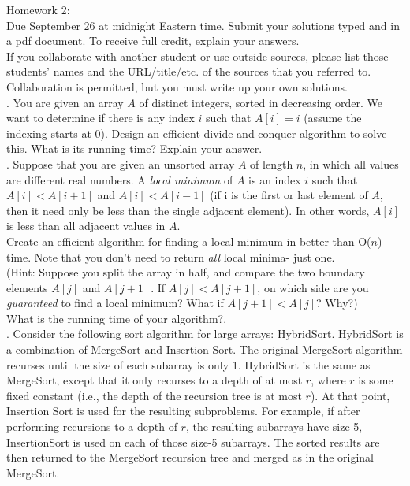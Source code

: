 \documentclass[12pt]{article}
\begin{document}
\noindent
\large Homework 2:\\
 \normalsize 
 \noindent
Due September 26 at midnight Eastern time.  Submit your solutions typed and in a pdf document.  To receive full credit, explain your answers.\\

\noindent
If you collaborate with another student or use outside sources, please list those students' names and the URL/title/etc. of the sources that you referred to.  Collaboration is permitted, but you must write up your own solutions.\\

.  You are given an array $A$ of distinct integers, sorted in decreasing order.  We want to determine if there is any index $i$ such that $A[i] = i$ (assume the indexing starts at 0).  Design an efficient divide-and-conquer algorithm to solve this.  What is its running time?  Explain your answer.\\

.  Suppose that you are given an unsorted array $A$ of length $n$, in which all values are different real numbers.  A \textit{local minimum} of $A$ is an index $i$ such that $A[i] < A[i + 1]$ and $A[i] < A[i - 1]$ (if i is the first or last element of $A$, then it need only be less than the single adjacent element).  In other words, $A[i]$ is less than all adjacent values in $A$.\\

\noindent
Create an efficient algorithm for finding a local minimum in better than O($n$) time.  Note that you don't need to return \textit{all} local minima- just one.\\

\noindent
(Hint: Suppose you split the array in half, and compare the two boundary elements $A[j]$ and $A[j + 1]$.  If $A[j] < A[j + 1]$, on which side are you \textit{guaranteed} to find a local minimum?  What if $A[j + 1] < A[j]$?  Why?)\\

\noindent
What is the running time of your algorithm?.\\

.  Consider the following sort algorithm for large arrays: HybridSort.  HybridSort is a combination of MergeSort and Insertion Sort.  The original MergeSort algorithm recurses until the size of each subarray is only 1.  HybridSort is the same as MergeSort, except that it only recurses to a depth of at most $r$, where $r$ is some fixed constant (i.e., the depth of the recursion tree is at most $r$).  At that point, Insertion Sort is used for the resulting subproblems.  For example, if after performing recursions to a depth of $r$, the resulting subarrays have size 5, InsertionSort is used on each of those size-5 subarrays.  The sorted results are then returned to the MergeSort recursion tree and merged as in the original MergeSort.\\
\end{document}
